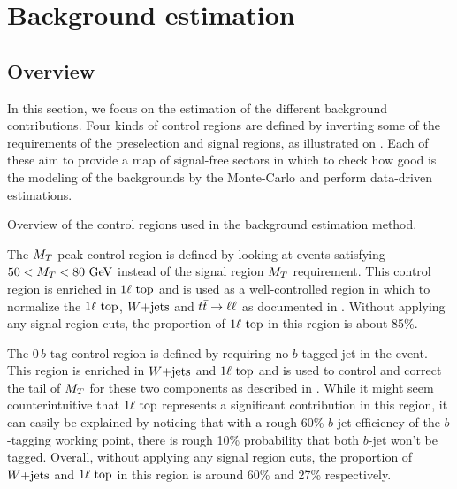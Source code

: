     \section{Background estimation \label{sec:analysis_backgroundEstimation}}

        \subsection{Overview}

    In this section, we focus on the estimation of the different background contributions.
    Four kinds of control regions are defined by inverting some of the requirements of the
    preselection and signal regions, as illustrated on .
    Each of these aim to provide a map of signal-free sectors in which to check how good is the
    modeling of the backgrounds by the Monte-Carlo and perform data-driven estimations.

                     {Overview of the control regions used in the background estimation method.}

    The $M_T$-peak control region is defined by looking at events satisfying $50 < M_T <
    80~\text{GeV}$ instead of the signal region $M_T$ requirement. This control region is enriched
    in $1\ell~\text{top}$ and is used as a well-controlled region in which to normalize the
    $1\ell~\text{top}$, $\text{$W$+jets}$ and $t\bar{t} \rightarrow \ell \ell$ as documented in .
    Without applying any signal region cuts, the proportion of $1\ell~\text{top}$ in this
    region is about 85\%.

    The $0\, b\text{-tag}$ control region is defined by requiring no $b$-tagged jet in the
    event. This region is enriched in $\text{$W$+jets}$ and $1\ell~\text{top}$ and is used to control
    and correct the tail of $M_T$ for these two components as described in .
    While it might seem counterintuitive that $1\ell~\text{top}$ represents a significant
    contribution in this region, it can easily be explained by noticing that with a rough
    60\% $b$-jet efficiency of the $b$-tagging working point, there is rough 10\% probability
    that both $b$-jet won't be tagged. Overall, without applying any signal region cuts,
    the proportion of $\text{$W$+jets}$ and $1\ell~\text{top}$ in this region is around 60\% and 27\%
    respectively.


